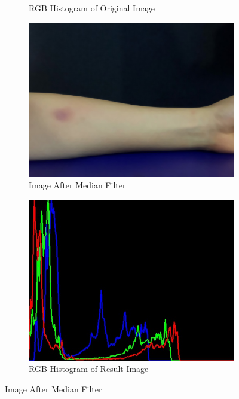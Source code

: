 \begin{figure}[!h]
\begin{subfigure}{.5\textwidth}
  \caption{RGB Histogram of Original Image}
  \label{fig:sub1}
\end{subfigure}
\begin{subfigure}{.5\textwidth}
  \centering
  \includegraphics[scale=0.23]{img/filter}
  \caption{Image After Median Filter}
  \label{fig:sub2}
\end{subfigure}%
\begin{subfigure}{.5\textwidth}
  \centering
  \includegraphics[scale=0.43]{img/medianrgb}
  \caption{RGB Histogram of Result Image}
  \label{fig:sub1}
\end{subfigure}
\label{fig:test}
\caption{Image After Median Filter}
\end{figure}
  
